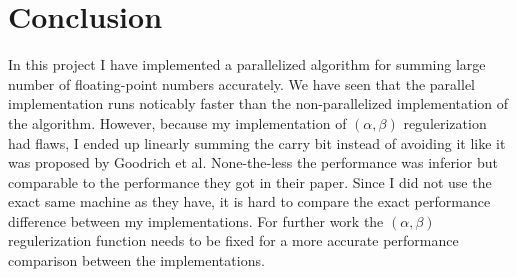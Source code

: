 \documentclass[11pt]{article}       %
\begin{document}
\section{Conclusion} \label{concl}

In this project I have implemented a parallelized algorithm for summing large number of floating-point numbers accurately. We have seen that the parallel implementation runs noticably faster than the non-parallelized implementation of the algorithm. However, because my implementation of $(\alpha, \beta)$ regulerization had flaws, I ended up linearly summing the carry bit instead of avoiding it like it was proposed by Goodrich et al. None-the-less the performance was inferior but comparable to the performance they got in their paper. Since I did not use the exact same machine as they have, it is hard to compare the exact performance difference between my implementations. For further work the $(\alpha, \beta)$ regulerization function needs to be fixed for a more accurate performance comparison between the implementations.



\end{document}

